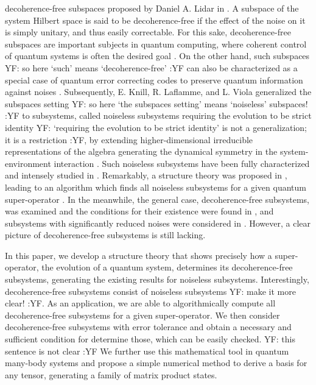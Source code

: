 \documentclass[journal]{IEEEtran}
\newcommand{\authorComment}[3]{\color{#1}#2: {#3} :#2\color{black}}
\newcommand{\yf}[1]{\authorComment{blue}{YF}{#1}}
\begin{document}
decoherence-free subspaces proposed by Daniel A. Lidar in \cite{lidar1998decoherence}. A subspace of the system Hilbert space is said to be decoherence-free if the effect of the noise on it is simply unitary, and thus easily correctable. For this sake, decoherence-free subspaces are important subjects in quantum computing, where coherent control of quantum systems is often the desired goal \cite{lidar2012review}. On the other hand, such subspaces \yf{so here `such' means `decoherence-free'} can also be characterized as a special case of quantum error correcting codes to preserve quantum information against noises \cite{lidar2012review}.    Subsequently, E. Knill, R. Laflamme, and L. Viola generalized the subspaces setting \yf{so here `the subspaces setting' means `noiseless' subspaces!} to subsystems, called noiseless subsystems requiring the evolution to be strict identity \yf{`requiring the evolution to be strict identity' is not a generalization; it is a restriction}, by extending higher-dimensional irreducible representations of the algebra generating the dynamical symmetry in the system-environment interaction \cite{knill2000theory}. Such noiseless subsystems have been fully characterized and intensely studied in \cite{choi2006method,blume2010information,beny2007generalization,kribs2006quantum,kribs2005unified}. Remarkably, a structure theory was proposed in \cite{choi2006method}, leading to an algorithm which finds all noiseless subsystems for a given quantum super-operator \cite{knill2006protected,wang2013numerical}. In the meanwhile, the general case, decoherence-free subsystems, was examined and the conditions for their existence were found in \cite{shabani2005theory}, and subsystems with significantly reduced noises  were considered in \cite{wang2016minimal}. However, a clear picture of decoherence-free subsystems is still lacking. 

In this paper,  we develop a structure theory that shows precisely how a super-operator, the evolution of a quantum system, determines its decoherence-free subsystems, generating the existing results for noiseless subsystems. Interestingly, decoherence-free subsystems consist of noiseless subsystems \yf{make it more clear!}. As an application, we are able to algorithmically compute all decoherence-free subsystems for a given super-operator. We then consider decoherence-free subsystems with error tolerance and obtain a necessary and sufficient condition for  determine those, which can be easily checked. \yf{this sentence is not clear} 
We further use this mathematical tool in quantum many-body systems and propose a simple numerical method to derive a basis for any tensor, generating a family of matrix product states. 
\end{document}
